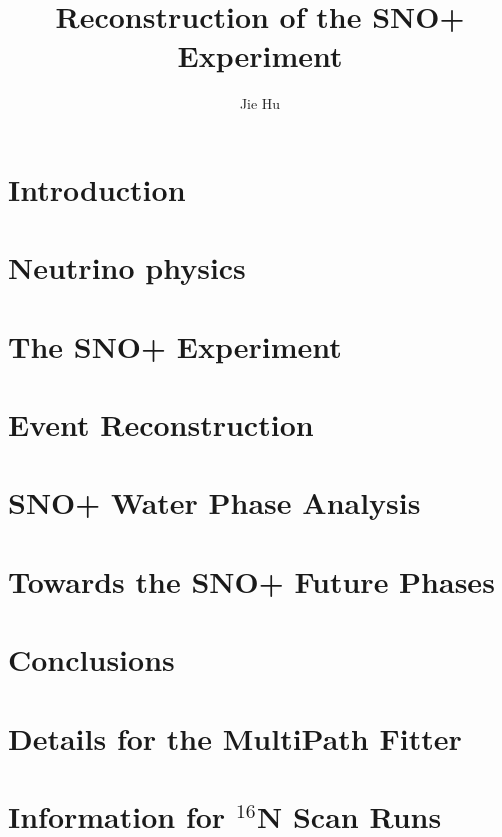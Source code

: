 \documentclass[phd,black]{PrincetonThesis}
\title{Reconstruction of the SNO+ Experiment}
\author{Jie Hu}
\begin{document}
\begin{frontmatter}
  
  \begin{thesisabstract}
    
  \end{thesisabstract}
  
  \begin{acknowledgements}
    
  \end{acknowledgements}
  
\end{frontmatter}

\cleardoublepage
\chapter{Introduction}

\chapter{Neutrino physics}

\chapter{The SNO+ Experiment}

\chapter{Event Reconstruction}

\chapter{SNO+ Water Phase Analysis}

\chapter{Towards the SNO+ Future Phases}

\chapter{Conclusions}


\appendix

\cleardoublepage
\chapter{Details for the MultiPath Fitter}

\chapter{Information for $^{16}$N Scan Runs}

	\cleardoublepage
	\nocite{*} %
	
\end{document}
